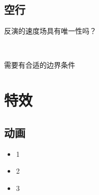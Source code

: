 \subsection{空行}
\begin{frame}
	反演的速度场具有唯一性吗？
	
	\qquad
	
	~\\
	
	\qquad
	

	需要有合适的边界条件
\end{frame}

\section{特效}
\subsection{动画}
\begin{frame}
	\begin{itemize}
		\item 1
		\item 2
		\pause
		\item 3
	\end{itemize}
\end{frame}



